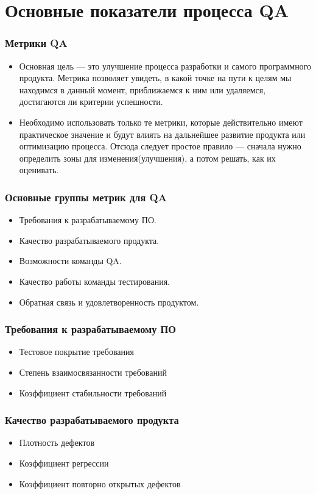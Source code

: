 \documentclass{../industrial-development}
\begin{document}
	\section{Основные показатели процесса QA}
	\begin{frame} \frametitle{Метрики QA}
		\begin{itemize}
			\item Основная цель --- это улучшение процесса разработки и самого программного продукта. Метрика позволяет увидеть, в какой точке на пути к целям мы находимся в данный момент, приближаемся к ним или удаляемся, достигаются ли критерии успешности.
			\item Необходимо использовать только те метрики, которые действительно имеют практическое значение и будут влиять на дальнейшее развитие продукта или оптимизацию процесса. Отсюда следует простое правило --- сначала нужно определить зоны для изменения(улучшения), а потом решать, как их оценивать.
		\end{itemize}
	\end{frame}

	\begin{frame} \frametitle{Основные группы метрик для QA}
		\begin{itemize}
			\item Требования к разрабатываемому ПО.
			\item Качество разрабатываемого продукта.
			\item Возможности команды QA.
			\item Качество работы команды тестирования.
			\item Обратная связь и удовлетворенность продуктом.
		\end{itemize}
	\end{frame}
	\begin{frame} \frametitle{Требования к разрабатываемому ПО}
		\begin{itemize}
			\item Тестовое покрытие требования 
			\item Степень взаимосвязанности требований
			\item Коэффициент стабильности требований
		\end{itemize}
	\end{frame}

	\begin{frame} \frametitle{Качество разрабатываемого продукта}
		\begin{itemize}
			\item Плотность дефектов
			\item Коэффициент регрессии
			\item Коэффициент повторно открытых дефектов
		\end{itemize}
	\end{frame}
\end{document}
